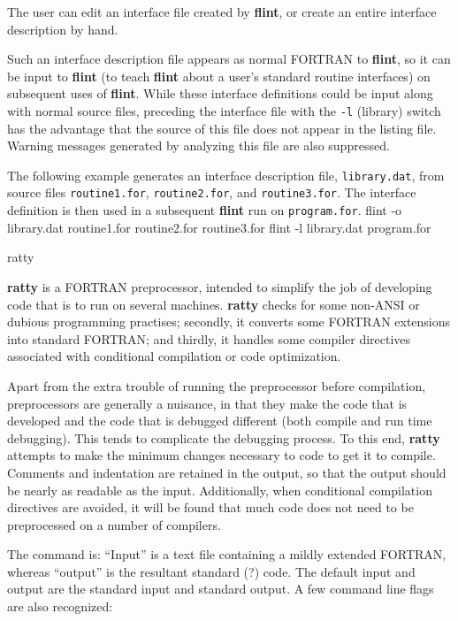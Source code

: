 The user can edit an interface file created by {\bf flint}, or create an
entire interface description by hand.

Such an interface description file appears as normal FORTRAN to {\bf flint},
so it can be input to {\bf flint} (to teach {\bf flint} about a user's
standard routine interfaces) on subsequent uses of {\bf flint}. While
these interface definitions could be input along with normal source files,
preceding the interface file with the {\tt -l} (library) switch has the
advantage that the source of this file does not appear in the listing
file. Warning messages generated by analyzing this file are also suppressed.

The following example generates an interface description file,
{\tt library.dat}, from source files {\tt routine1.for}, {\tt routine2.for},
and {\tt routine3.for}.  The interface definition is then used in a
subsequent {\bf flint} run on {\tt program.for}.
{\ninepoint\begintt
     flint -o library.dat routine1.for routine2.for routine3.for
     flint -l library.dat program.for
\endtt}

\beginsection ratty

{\bf ratty} is a FORTRAN preprocessor, intended to simplify the
job of developing code that is to run on several machines.  {\bf ratty}
checks for some non-ANSI or dubious programming practises; secondly, it
converts some FORTRAN extensions into standard FORTRAN; and thirdly, it
handles some compiler directives associated with conditional compilation
or code optimization.

Apart from the extra trouble of running the preprocessor before
compilation,  preprocessors are generally a nuisance, in that they make
the code that is developed and the code that is debugged different
(both compile and run time debugging).  This tends to complicate the
debugging process. To this end, {\bf ratty} attempts to make the minimum
changes necessary to code to get it to compile.  Comments and indentation
are retained in the output, so that the output should be nearly as
readable as the input.  Additionally, when conditional compilation
directives are avoided, it will be found that much code does not need
to be preprocessed on a number of compilers.


The command is:
{\ninepoint\begintt
\endtt}
``Input'' is a text file containing a mildly extended FORTRAN, whereas
``output'' is the resultant standard (?) code. The default input and
output are the standard input and standard output. A few command line
flags are also recognized:

